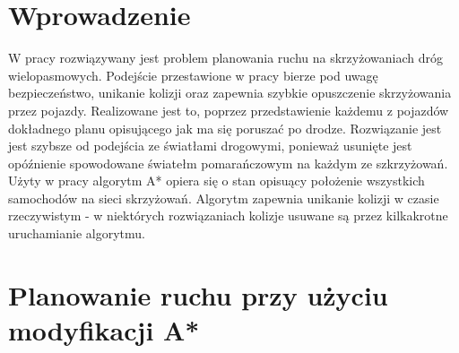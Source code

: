  \label{chap:thesis}


\section{Wprowadzenie}

W pracy rozwiązywany jest problem planowania ruchu na skrzyżowaniach dróg wielopasmowych. Podejście przestawione w pracy bierze pod uwagę bezpieczeństwo, unikanie kolizji oraz zapewnia szybkie opuszczenie skrzyżowania przez pojazdy. Realizowane jest to, poprzez przedstawienie każdemu z pojazdów dokładnego planu opisującego jak ma się poruszać po drodze. Rozwiązanie jest jest szybsze od podejścia ze światłami drogowymi, ponieważ usunięte jest opóźnienie spowodowane światełm pomarańczowym na każdym ze szkrzyżowań. Użyty w pracy algorytm A* opiera się o stan opisuący położenie wszystkich samochodów na sieci skrzyżowań. Algorytm zapewnia unikanie kolizji w czasie rzeczywistym - w niektórych rozwiązaniach kolizje usuwane są przez kilkakrotne uruchamianie algorytmu.
\section{Planowanie ruchu przy użyciu modyfikacji A*}

